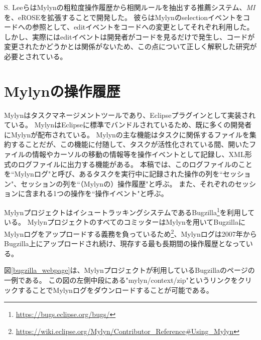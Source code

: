 \documentclass[a4paper]{jsbook}
\begin{document}
S. Leeら\cite{SLee:2015}はMylynの粗粒度操作履歴から相関ルールを抽出する推薦システム、{\it MI}を、eROSE\cite{Zimmermann:2005}を拡張することで開発した。
彼らはMylynのselectionイベントをコードへの参照として、editイベントをコードへの変更としてそれぞれ利用した。
しかし、実際にはeditイベントは開発者がコードを見るだけで発生し、コードが変更されたかどうかとは関係がないため、この点について正しく解釈した研究が必要とされている。

\chapter{Mylynの操作履歴}\label{mylyn_chap}
Mylyn\cite{Kersten:2005}はタスクマネージメントツールであり、Eclipseプラグインとして実装されている。
MylynはEclipseに標準でバンドルされているため、既に多くの開発者にMylynが配布されている。
Mylynの主な機能はタスクに関係するファイルを集約することだが、この機能に付随して、タスクが活性化されている間、開いたファイルの情報やカーソルの移動の情報等を操作イベントとして記録し、XML形式のログファイルに出力する機能がある。
本稿では、このログファイルのことを``Mylynログ"と呼び、あるタスクを実行中に記録された操作の列を``セッション"、セッションの列を``（Mylynの）操作履歴"と呼ぶ。
また、それぞれのセッションに含まれる1つの操作を``操作イベント"と呼ぶ。

MylynプロジェクトはイシュートラッキングシステムであるBugzilla\footnote{\url{https://bugs.eclipse.org/bugs/}}を利用している。
MylynプロジェクトのすべてのコミッターはMylynを用いてBugzillaにMylynログをアップロードする義務を負っているため\footnote{\url{https://wiki.eclipse.org/Mylyn/Contributor_Reference\#Using_Mylyn}}、Mylynログは2007年からBugzilla上にアップロードされ続け、現存する最も長期間の操作履歴となっている。

図\ref{bugzilla_webpage}は、Mylynプロジェクトが利用しているBugzillaのページの一例である。
この図の左側中段にある"mylyn/context/zip"というリンクをクリックすることでMylynログをダウンロードすることが可能である。
\end{document}
